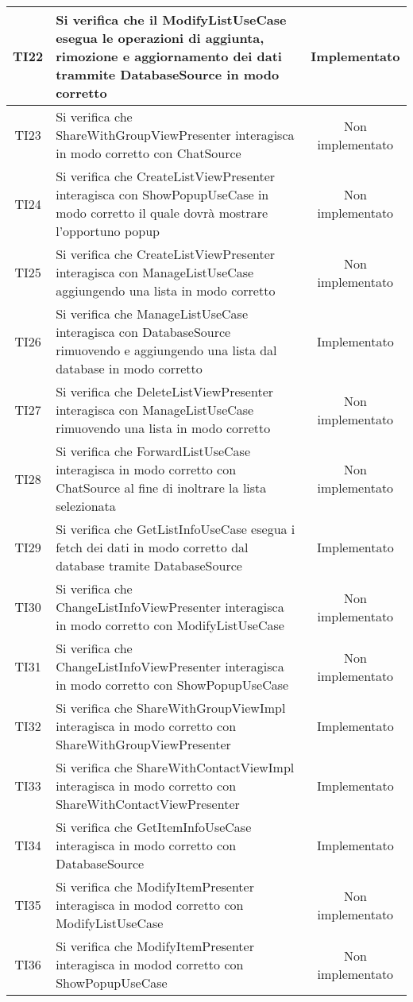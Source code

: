 \begin{center}
\begin{longtable}{|c|>{\centering}m{10cm}|c|}
		TI22 & Si verifica che il ModifyListUseCase esegua le operazioni di aggiunta, rimozione e aggiornamento dei dati trammite DatabaseSource in modo corretto & Implementato \\ \hline
		TI23 & Si verifica che ShareWithGroupViewPresenter interagisca in modo corretto con ChatSource & Non implementato \\ \hline
		TI24 & Si verifica che CreateListViewPresenter interagisca con ShowPopupUseCase in modo corretto il quale dovrà mostrare l'opportuno popup & Non implementato \\ \hline
		TI25 & Si verifica che CreateListViewPresenter interagisca con ManageListUseCase aggiungendo una lista in modo corretto & Non implementato \\ \hline
		TI26 & Si verifica che ManageListUseCase interagisca con DatabaseSource rimuovendo e aggiungendo una lista dal database in modo corretto & Implementato \\ \hline
		TI27 & Si verifica che DeleteListViewPresenter interagisca con ManageListUseCase rimuovendo una lista in modo corretto & Non implementato \\ \hline
		TI28 & Si verifica che ForwardListUseCase interagisca in modo corretto con ChatSource al fine di inoltrare la lista selezionata & Non implementato \\ \hline
		TI29 & Si verifica che GetListInfoUseCase esegua i fetch dei dati in modo corretto dal database tramite DatabaseSource & Implementato \\ \hline
		TI30 & Si verifica che ChangeListInfoViewPresenter interagisca in modo corretto con ModifyListUseCase & Non implementato \\ \hline
		TI31 & Si verifica che ChangeListInfoViewPresenter interagisca in modo corretto con ShowPopupUseCase & Non implementato \\ \hline
		TI32 & Si verifica che ShareWithGroupViewImpl interagisca in modo corretto con ShareWithGroupViewPresenter & Implementato \\ \hline
		TI33 & Si verifica che ShareWithContactViewImpl interagisca in modo corretto con ShareWithContactViewPresenter & Implementato \\ \hline
		TI34 & Si verifica che GetItemInfoUseCase interagisca in modo corretto con DatabaseSource & Implementato \\ \hline
		TI35 & Si verifica che ModifyItemPresenter interagisca in modod corretto con ModifyListUseCase & Non implementato \\ \hline
		TI36 & Si verifica che ModifyItemPresenter interagisca in modod corretto con ShowPopupUseCase & Non implementato \\ \hline

\end{longtable}
\end{center}
